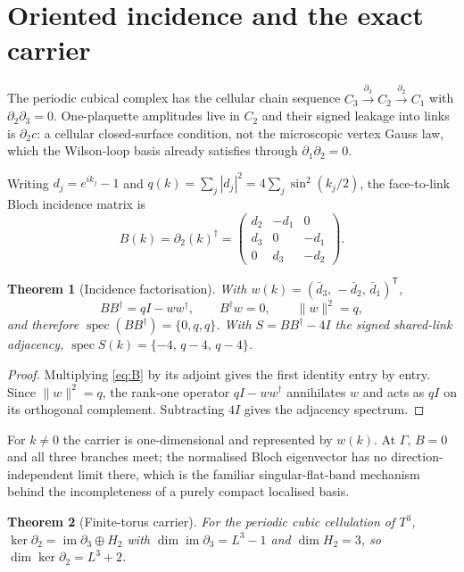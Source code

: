 \documentclass[11pt]{article}
\theoremstyle{plain}
\newtheorem{theorem}{Theorem}
\theoremstyle{definition}
\theoremstyle{remark}
\newcommand{\chk}[1]{}
\newcommand{\dg}{^{\dagger}}
\begin{document}
\section{Oriented incidence and the exact carrier}
\label{sec:carrier}

The periodic cubical complex has the cellular chain sequence
$C_3\xrightarrow{\partial_3}C_2\xrightarrow{\partial_2}C_1$ with
$\partial_2\partial_3=0$. One-plaquette amplitudes live in $C_2$ and their
signed leakage into links is $\partial_2c$: a cellular closed-surface
condition, not the microscopic vertex Gauss law, which the Wilson-loop basis
already satisfies through $\partial_1\partial_2=0$.

Writing $d_j=e^{ik_j}-1$ and $q(k)=\sum_j|d_j|^2=4\sum_j\sin^2(k_j/2)$, the
face-to-link Bloch incidence matrix is
\begin{equation}\label{eq:B}
  B(k)=\partial_2(k)\dg=
  \begin{pmatrix}
    d_2 & -d_1 & 0\\
    d_3 & 0 & -d_1\\
    0 & d_3 & -d_2
  \end{pmatrix}.
\end{equation}

\begin{theorem}[Incidence factorisation]\label{thm:fact}
With $w(k)=(\bar d_3,\,-\bar d_2,\,\bar d_1)^{\mathsf T}$,
\[
  BB\dg=qI-ww\dg,\qquad B\dg w=0,\qquad \|w\|^2=q,
\]
and therefore $\operatorname{spec}(BB\dg)=\{0,q,q\}$. With
$S=BB\dg-4I$ the signed shared-link adjacency,
$\operatorname{spec}S(k)=\{-4,\,q-4,\,q-4\}$.
\end{theorem}

\begin{proof}
Multiplying \eqref{eq:B} by its adjoint gives the first identity entry by
entry. Since $\|w\|^2=q$, the rank-one operator $qI-ww\dg$ annihilates $w$ and
acts as $qI$ on its orthogonal complement. Subtracting $4I$ gives the
adjacency spectrum.
\end{proof}
\chk{B B\^{}dagger = q I - d conj(d)\^{}T for the curl incidence}

For $k\neq0$ the carrier is one-dimensional and represented by $w(k)$. At
$\Gamma$, $B=0$ and all three branches meet; the normalised Bloch eigenvector
has no direction-independent limit there, which is the familiar
singular-flat-band mechanism behind the incompleteness of a purely compact
localised basis.

\begin{theorem}[Finite-torus carrier]\label{thm:carrier}
For the periodic cubic cellulation of $T^3$,
$\ker\partial_2=\operatorname{im}\partial_3\oplus H_2$ with
$\dim\operatorname{im}\partial_3=L^3-1$ and $\dim H_2=3$, so
$\dim\ker\partial_2=L^3+2$.
\end{theorem}
\end{document}
